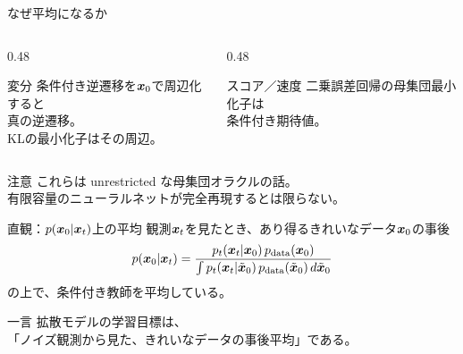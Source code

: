 \begin{frame}{なぜ平均になるか}
    \begin{columns}[T,onlytextwidth]
        \begin{column}{0.48\textwidth}
            \begin{block}{変分}
                条件付き逆遷移を$\bm{x}_0$で周辺化すると\\
                真の逆遷移。\\
                KLの最小化子はその周辺。
            \end{block}
        \end{column}
        \begin{column}{0.48\textwidth}
            \begin{block}{スコア／速度}
                二乗誤差回帰の母集団最小化子は\\
                条件付き期待値。
            \end{block}
        \end{column}
    \end{columns}
    \vspace{0.5em}
    \begin{alertblock}{注意}
        これらは unrestricted な母集団オラクルの話。\\
        有限容量のニューラルネットが完全再現するとは限らない。
    \end{alertblock}
\end{frame}
\asmain
\begin{frame}{直観：$p(\bm{x}_0|\bm{x}_t)$上の平均}
    観測$\bm{x}_t$を見たとき、あり得るきれいなデータ$\bm{x}_0$の事後
    \[
        p(\bm{x}_0|\bm{x}_t)
        =
        \frac{p_t(\bm{x}_t|\bm{x}_0)\,p_{\mathrm{data}}(\bm{x}_0)}
             {\int p_t(\bm{x}_t|\tilde{\bm{x}}_0)\,p_{\mathrm{data}}(\tilde{\bm{x}}_0)\,d\tilde{\bm{x}}_0}
    \]
    の上で、条件付き教師を平均している。
    \begin{block}{一言}
        拡散モデルの学習目標は、\\
        「ノイズ観測から見た、きれいなデータの事後平均」である。
    \end{block}
\end{frame}
